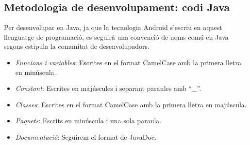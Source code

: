 \subsection{Metodologia de desenvolupament: codi Java}
Per desenvolupar en Java, ja que la tecnologia Android s'escriu en aquest llenguatge de programació, es seguirà una convenció de noms comú en Java segons estipula la comunitat de desenvolupadors.
\begin{itemize}
\item \textit{Funcions i variables}: Escrites en el format CamelCase\cite{camelcase} amb la primera lletra en minúscula.
\item \textit{Constant}: Escrites en majúscules i separant paraules amb “\_”.
\item \textit{Classes}: Escrites en el format CamelCase amb la primera lletra en majúscula.
\item \textit{Paquets}: Escrits en minúscula i una sola paraula.
\item \textit{Documentació}: Seguirem el format de JavaDoc\cite{javadoc}.
\end{itemize}